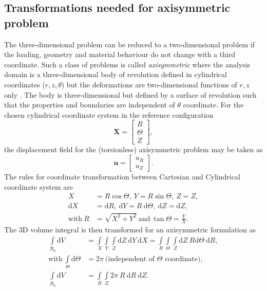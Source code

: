 \subsection{Transformations needed for axisymmetric problem}
The three-dimensional problem can be reduced to a two-dimensional problem if the loading, geometry and material behaviour do not change with a third coordinate. Such a class of problems is called \textit{axisymmetric} where the analysis domain is a three-dimensional body of revolution defined in cylindrical coordinates ($r, z, \theta$) but the deformations are two-dimensional functions of $r, z$ only \cite{Zienkiewicz2013}. The body is three-dimensional but defined by a surface of revolution such that the properties and boundaries are independent of $\theta$ coordinate. For the chosen cylindrical coordinate system in the reference configuration
\begin{equation}
\mathbf{X} = \begin{bmatrix}
R \\
\Theta \\
Z
\end{bmatrix},
\end{equation}
the displacement field for the (torsionless) axisymmetric problem may be taken as 
\begin{equation}
\mathbf{u} = \begin{bmatrix}
u_R \\
u_Z
\end{bmatrix}.
\label{eq:2.25}
\end{equation}
The rules for coordinate transformation between Cartesian and Cylindrical coordinate system are
\begin{align}
X &= R \cos \Theta, \ Y = R \sin \Theta, \ Z = Z, \nonumber \\
\mathrm{d}X &= \mathrm{d}R, \ \mathrm{d}Y = R \ \mathrm{d} \Theta, \ \mathrm{d}Z = \mathrm{d}Z, \nonumber \\
\text{with} \ R &= \sqrt{X^2 + Y^2} \ \text{and} \ \tan \Theta = \frac{Y}{X}.
\end{align}
The 3D volume integral is then transformed for an axisymmetric formulation as
\begin{align}
\int\limits_{\mathcal{B}_0} \mathrm{d} V &= \int\limits_{X} \int\limits_{Y} \int\limits_{Z} \mathrm{d} Z \ \mathrm{d} Y \ \mathrm{d} X = \int\limits_{R} \int\limits_{\Theta} \int\limits_{Z} \mathrm{d} Z \ R \mathrm{d} \Theta \ \mathrm{d} R, \nonumber \\
\text{with} \ \int\limits_{\Theta} \mathrm{d} \Theta &= 2 \pi \ \text{(independent of $\Theta$ coordinate)}, \nonumber \\
\int\limits_{\mathcal{B}_0} \mathrm{d} V &= \int\limits_{R} \int\limits_{Z} 2 \pi \ R \ \mathrm{d} R \ \mathrm{d} Z. 
\end{align}
